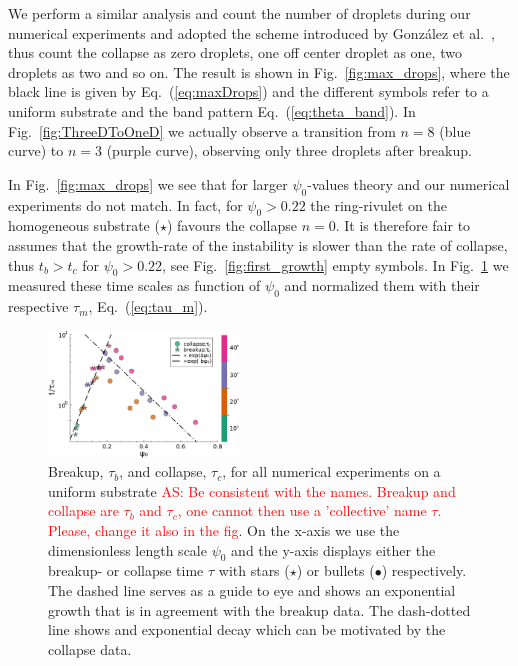 \documentclass[twoside,twocolumn,9pt]{article}
\begin{document}
We perform a similar analysis and count the number of droplets during our numerical experiments and adopted the scheme introduced by Gonz{\'a}lez et al.~\cite{gonzalezStabilityLiquidRing2013}, thus count the collapse as zero droplets, one off center droplet as one, two droplets as two and so on.
The result is shown in Fig.~\ref{fig:max_drops}, where the black line is given by Eq.~(\ref{eq:maxDrops}) and the different symbols refer to a uniform substrate and the band pattern Eq.~(\ref{eq:theta_band}).
In Fig.~\ref{fig:ThreeDToOneD} we actually observe a transition from $n = 8$ (blue curve) to $n = 3$ (purple curve), observing only three droplets after breakup.

In Fig.~\ref{fig:max_drops} we see that for larger $\psi_0$-values theory and our numerical experiments do not match.
In fact, for $\psi_0 > 0.22$ the ring-rivulet on the homogeneous substrate (\textcolor{jlorange}{$\star$}) favours the collapse $n = 0$. 
It is therefore fair to assumes that the growth-rate of the instability is slower than the rate of collapse, thus $t_b > t_c$ for $\psi_0 > 0.22$, see Fig.~\ref{fig:first_growth} empty symbols.
In Fig.~\ref{fig:timescaleDifference} we measured these time scales as function of $\psi_0$ and normalized them with their respective $\tau_m$, Eq.~(\ref{eq:tau_m}).
\begin{figure}
    \centering
    \includegraphics[width = 0.45\textwidth]{assets/uniform_timescalesCC.pdf}
    \caption{Breakup, $\tau_b$, and collapse, $\tau_c$, for all numerical experiments on a uniform substrate \textcolor{red}{AS: Be consistent with the names. Breakup and collapse are $\tau_b$ and $\tau_c$, one cannot then use 
    a 'collective' name $\tau$. Please, change it also in the fig}.
        On the x-axis we use the dimensionless length scale $\psi_0$ and the y-axis displays either the breakup- or collapse time $\tau$ with stars (\textcolor{jlorange}{$\star$}) or bullets (\textcolor{jlblue}{$\bullet$}) respectively.
        The dashed line serves as a guide to eye and shows an exponential growth that is in agreement with the breakup data. 
        The dash-dotted line shows and exponential decay which can be motivated by the collapse data.
        }
    \label{fig:timescaleDifference}
\end{figure}
\end{document}
